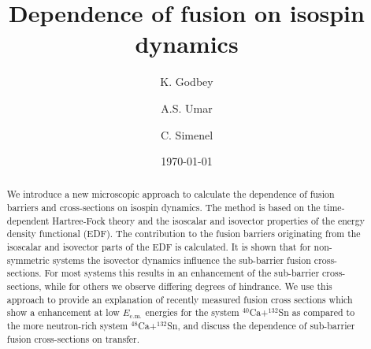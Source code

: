 \documentclass[aps,prl,twocolumn,superscriptaddress,floatfix,10pt]{revtex4-1}
\begin{document}
\title{Dependence of fusion on isospin dynamics}

\author{K. Godbey}

\author{A.S. Umar}

\author{C. Simenel}

\date{\today}

\begin{abstract}
We introduce a new microscopic approach to calculate the dependence of fusion barriers and cross-sections on
isospin dynamics. The method is based on the time-dependent Hartree-Fock theory and
the isoscalar and isovector properties of the energy density functional (EDF). The contribution to
the fusion barriers originating from the isoscalar and isovector parts of the EDF is calculated.
It is shown that for non-symmetric systems the isovector dynamics influence the sub-barrier fusion
cross-sections. For most systems this results in an enhancement of the sub-barrier cross-sections,
while for others we observe differing degrees of hindrance.
We use this approach to provide an explanation of recently measured fusion cross sections which show a  enhancement at low $E_\mathrm{c.m.}$ energies
for the system $^{40}$Ca+$^{132}$Sn as compared to the more neutron-rich system
$^{48}$Ca+$^{132}$Sn, and discuss the dependence of sub-barrier fusion cross-sections on transfer.

\end{abstract}
\maketitle
\end{document}
